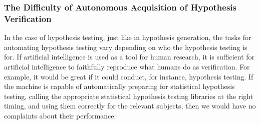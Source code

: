 





\subsubsection{The Difficulty of Autonomous Acquisition of Hypothesis Verification}
In the case of hypothesis testing, just like in hypothesis generation, the tasks for automating hypothesis testing vary depending on who the hypothesis testing is for. If artificial intelligence is used as a tool for human research, it is sufficient for artificial intelligence to faithfully reproduce what humans do as verification. For example, it would be great if it could conduct, for instance, hypothesis testing. If the machine is capable of automatically preparing for statistical hypothesis testing, calling the appropriate statistical hypothesis testing libraries at the right timing, and using them correctly for the relevant subjects, then we would have no complaints about their performance.

